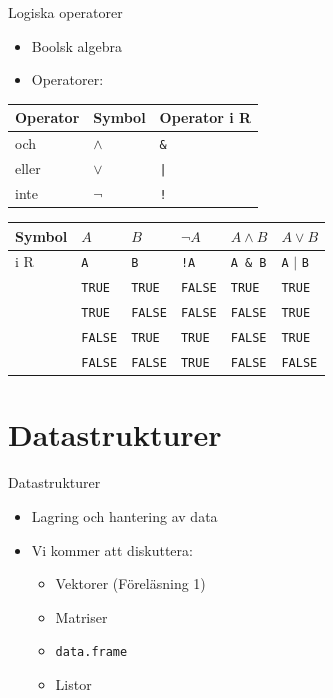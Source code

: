 \documentclass[
  11pt,
  ignorenonframetext,
]{beamer}
\providecommand{\tightlist}{%
  \setlength{\itemsep}{0pt}\setlength{\parskip}{0pt}}
\begin{document}
\begin{frame}[fragile]{Logiska operatorer}
\protect\hypertarget{logiska-operatorer}{}
\begin{itemize}
\tightlist
\item
  Boolsk algebra
\item
  Operatorer:
\end{itemize}

\begin{longtable}[]{@{}lll@{}}
\toprule
Operator & Symbol & Operator i R\tabularnewline
\midrule
\endhead
och & \(\wedge{}\) & \texttt{\&}\tabularnewline
eller & \(\vee{}\) & \texttt{|}\tabularnewline
inte & \(\neg{}\) & \texttt{!}\tabularnewline
\bottomrule
\end{longtable}

\pause

\begin{longtable}[]{@{}llllll@{}}
\toprule
Symbol & \(A\) & \(B\) & \(\neg A\) & \(A \wedge B\) &
\(A \vee B\)\tabularnewline
\midrule
\endhead
i R & \texttt{A} & \texttt{B} & \texttt{!A} & \texttt{A\ \&\ B} &
\texttt{A} \(|\) \texttt{B}\tabularnewline
& \texttt{TRUE} & \texttt{TRUE} & \texttt{FALSE} & \texttt{TRUE} &
\texttt{TRUE}\tabularnewline
& \texttt{TRUE} & \texttt{FALSE} & \texttt{FALSE} & \texttt{FALSE} &
\texttt{TRUE}\tabularnewline
& \texttt{FALSE} & \texttt{TRUE} & \texttt{TRUE} & \texttt{FALSE} &
\texttt{TRUE}\tabularnewline
& \texttt{FALSE} & \texttt{FALSE} & \texttt{TRUE} & \texttt{FALSE} &
\texttt{FALSE}\tabularnewline
\bottomrule
\end{longtable}
\end{frame}

\hypertarget{datastrukturer}{%
\section{Datastrukturer}\label{datastrukturer}}

\begin{frame}{Datastrukturer}
\protect\hypertarget{datastrukturer-1}{}
\begin{itemize}
\tightlist
\item
  Lagring och hantering av data
\item
  Vi kommer att diskuttera:

  \begin{itemize}
  \tightlist
  \item
    Vektorer (Föreläsning 1)
  \item
    Matriser
  \item
    \texttt{data.frame}
  \item
    Listor
  \end{itemize}
\end{itemize}
\end{frame}
\end{document}
